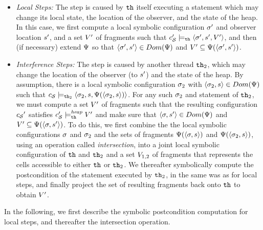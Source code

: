 \begin{itemize}
\item
  {\it Local Steps:} The step
  is caused by ${\tt th}$ itself executing a statement
  which may change its local state, the location of the observer,
  and the state of the heap.
  In this case, we first compute a local symbolic configuration $\sigma'$ and
  observer location $s'$, and a set $V'$ of fragments such that
$c_{\mathcal S}' \models_{{\tt th}} \left\langle\sigma',s',V'\right\rangle$,
  and then (if necessary) extend $\Psi$ so that
  $\left\langle\sigma',s'\right\rangle \in Dom(\Psi)$ and
  $ V' \subseteq \Psi(\left\langle\sigma',s'\right\rangle)$.
\item
  {\it Interference Steps:} The step is caused by another thread ${\tt th}_2$,
  which may change the location of the observer (to $s'$)
  and the state of the heap.
  By assumption, there is a local symbolic configuration $\sigma_2$
  with $\left\langle\sigma_2,s\right\rangle \in Dom(\Psi)$ such that
  $c_{\mathcal S} \models_{{\tt th}_2} \left\langle\sigma_2,s,\Psi(\left\langle\sigma_2,s\right\rangle)\right\rangle$.
  For any such $\sigma_2$ and statement of ${\tt th}_2$,
  we must compute a set $V'$ of fragments such that
  the resulting configuration ${c_{\mathcal S}}'$ satisfies
  $c_{\mathcal S}' \models_{{\tt th}}^{\mathit{heap}} V'$ and 
  make sure that $\left\langle\sigma,s'\right\rangle \in Dom(\Psi)$ and
  $V' \subseteq \Psi(\left\langle\sigma,s'\right\rangle)$.
  To do this, we first combine the the local symbolic configurations
  $\sigma$ and $\sigma_2$ and the sets of fragments
  $\Psi(\left\langle\sigma,s\right\rangle)$ and
  $\Psi(\left\langle\sigma_2,s\right\rangle)$, using an
  operation called {\em intersection}, into
  a joint local symbolic configuration of ${\tt th}$ and ${\tt th}_2$ and
  a set $V_{1,2}$ of fragments that represents the cells accessible
  to either ${\tt th}$ or ${\tt th}_2$.
  We thereafter symbolically compute the postcondition of the statement
  executed by ${\tt th}_2$, in the same was as for local steps,
  and finally project the set of resulting fragments back onto ${\tt th}$
  to obtain $V'$.
\end{itemize}
In the following, we first describe the symbolic postcondition computation for
local steps, and thereafter the intersection operation.


